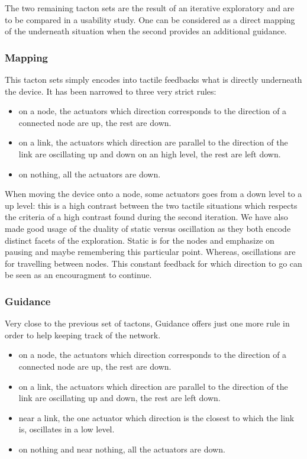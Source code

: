The two remaining tacton sets are the result of an iterative exploratory
and are to be compared in a usability study. One can be considered as a
direct mapping of the underneath situation when the second provides an
additional guidance.

\subsubsection{Mapping}\label{mapping}

This tacton sets simply encodes into tactile feedbacks what is directly
underneath the device. It has been narrowed to three very strict rules:

\begin{itemize}
\item
  on a node, the actuators which direction corresponds to the direction
  of a connected node are up, the rest are down.
\item
  on a link, the actuators which direction are parallel to the direction
  of the link are oscillating up and down on an high level, the rest are
  left down.
\item
  on nothing, all the actuators are down.
\end{itemize}

When moving the device onto a node, some actuators goes from a down
level to a up level: this is a high contrast between the two tactile
situations which respects the criteria of a high contrast found during
the second iteration. We have also made good usage of the duality of
static versus oscillation as they both encode distinct facets of the
exploration. Static is for the nodes and emphasize on pausing and maybe
remembering this particular point. Whereas, oscillations are for
travelling between nodes. This constant feedback for which direction to
go can be seen as an encouragment to continue.

\subsubsection{Guidance}\label{guidance}

Very close to the previous set of tactons, Guidance offers just one more
rule in order to help keeping track of the network.

\begin{itemize}
\item
  on a node, the actuators which direction corresponds to the direction
  of a connected node are up, the rest are down.
\item
  on a link, the actuators which direction are parallel to the direction
  of the link are oscillating up and down, the rest are left down.
\item
  near a link, the one actuator which direction is the closest to which
  the link is, oscillates in a low level.
\item
  on nothing and near nothing, all the actuators are down.
\end{itemize}


